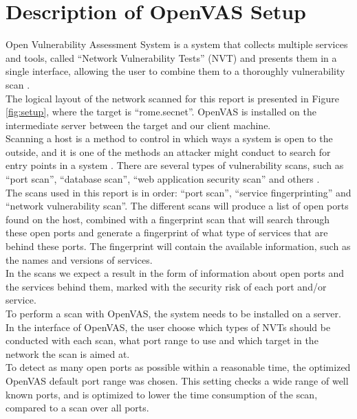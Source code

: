 \section{Description of OpenVAS Setup} \label{sec:setup}

Open Vulnerability Assessment System is a system that collects multiple services and tools, called “Network Vulnerability Tests” (NVT) and presents them in a single interface, allowing the user to combine them to a thoroughly vulnerability scan \cite{openvas}. \\

\noindent The logical layout of the network scanned for this report is presented in Figure \ref{fig:setup}, where the target is “rome.secnet”. OpenVAS is installed on the intermediate server between the target and our client machine. \\

\noindent Scanning a host is a method to control in which ways a system is open to the outside, and it is one of the methods an attacker might conduct to search for entry points in a system \cite{wiki}. There are several types of vulnerability scans, such as “port scan”, “database scan”, “web application security scan” and others \cite{hk}. \\

\noindent The scans used in this report is in order: “port scan”, “service fingerprinting” and “network vulnerability scan”. The different scans will produce a list of open ports found on the host, combined with a fingerprint scan that will search through these open ports and generate a fingerprint of what type of services that are behind these ports. The fingerprint will contain the available information, such as the names and versions of services. \\

\noindent In the scans we expect a result in the form of information about open ports and the services behind them, marked with the security risk of each port and/or service.\\

\noindent To perform a scan with OpenVAS, the system needs to be installed on a server. In the interface of OpenVAS, the user choose which types of NVTs should be conducted with each scan, what port range to use and which target in the network the scan is aimed at. \\

\noindent To detect as many open ports as possible within a reasonable time, the optimized OpenVAS default port range was chosen. This setting checks a 
wide range of well known ports, and is optimized to lower the time 
consumption of the scan, compared to a scan over all ports.\\

